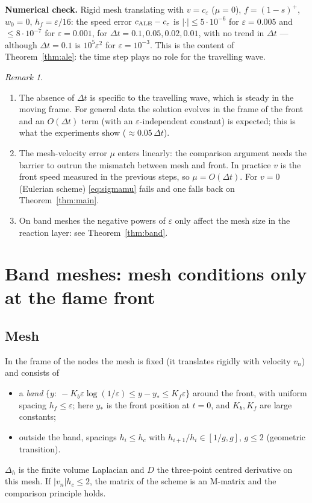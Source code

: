 \documentclass[11pt]{amsart}
\theoremstyle{remark}
\newtheorem{remark}[theorem]{Remark}
\newcommand{\ve}{\varepsilon}
\begin{document}
\noindent\textbf{Numerical check.} Rigid mesh translating with $v=c_\ve$
($\mu=0$), $f=(1-s)^+$, $w_0=0$, $h_f=\ve/16$: the speed error
$c_{\rm ALE}-c_\ve$ is $|{\cdot}|\le5\cdot10^{-6}$ for $\ve=0.005$ and
$\le8\cdot10^{-7}$ for $\ve=0.001$, for $\Delta t=0.1,0.05,0.02,0.01$, with no
trend in $\Delta t$ --- although $\Delta t=0.1$ is $10^5\ve^2$ for $\ve=10^{-3}$.
This is the content of Theorem~\ref{thm:ale}: the time step plays no role for
the travelling wave.

\begin{remark}
\begin{enumerate}
\item The absence of $\Delta t$ is specific to the travelling wave, which is
steady in the moving frame. For general data the solution evolves in the frame
of the front and an $O(\Delta t)$ term (with an $\ve$-independent constant) is
expected; this is what the experiments show ($\approx0.05\,\Delta t$).
\item The mesh-velocity error $\mu$ enters linearly: the comparison argument
needs the barrier to outrun the mismatch between mesh and front. In practice
$v$ is the front speed measured in the previous steps, so $\mu=O(\Delta t)$.
For $v=0$ (Eulerian scheme) \eqref{eq:sigmamu} fails and one falls back on
Theorem~\ref{thm:main}.
\item On band meshes the negative powers of $\ve$ only affect the mesh size in
the reaction layer: see Theorem~\ref{thm:band}.
\end{enumerate}
\end{remark}


\section{Band meshes: mesh conditions only at the flame front}\label{sec:band}

\subsection*{Mesh} In the frame of the nodes the mesh is fixed (it translates
rigidly with velocity $v_n$) and consists of
\begin{itemize}
\item a \emph{band} $\{y:\ -K_b\ve\log(1/\ve)\le y-y_*\le K_f\ve\}$ around the
front, with uniform spacing $h_f\le\ve$; here $y_*$ is the front position at
$t=0$, and $K_b,K_f$ are large constants;
\item outside the band, spacings $h_i\le h_c$ with $h_{i+1}/h_i\in[1/g,g]$,
$g\le2$ (geometric transition).
\end{itemize}
$\Delta_h$ is the finite volume Laplacian and $D$ the three-point centred
derivative on this mesh. If $|v_n|h_c\le2$, the matrix of the scheme is an
M-matrix and the comparison principle holds.
\end{document}
